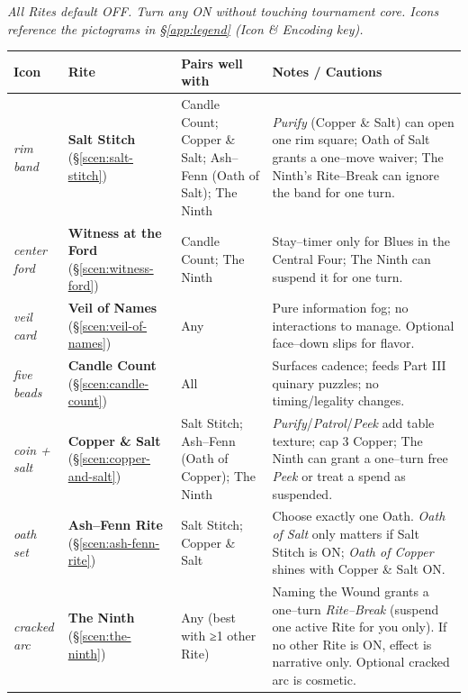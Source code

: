 \documentclass[11pt]{article}
\renewcommand{\arraystretch}{1.15}
\begin{document}
\begin{itemize}
\noindent\textit{All Rites default \textsc{OFF}. Turn any \textsc{ON} without touching tournament core. Icons reference the pictograms in \S\ref{app:legend} (Icon \& Encoding key).}

\medskip
\renewcommand{\arraystretch}{1.18}
\begin{tabular}{p{2.2cm} p{3.8cm} p{6.6cm} p{4.2cm}}
\toprule
\textbf{Icon} & \textbf{Rite} & \textbf{Pairs well with} & \textbf{Notes / Cautions}\\
\midrule
\textit{rim band} %
& \textbf{Salt Stitch} (\S\ref{scen:salt-stitch})
& Candle Count; Copper \& Salt; Ash–Fenn (Oath of Salt); The Ninth
& \emph{Purify} (Copper \& Salt) can open one rim square; Oath of Salt grants a one–move waiver; The Ninth’s Rite–Break can ignore the band for one turn.\\

\textit{center ford} %
& \textbf{Witness at the Ford} (\S\ref{scen:witness-ford})
& Candle Count; The Ninth
& Stay–timer only for Blues in the Central Four; The Ninth can suspend it for one turn.\\

\textit{veil card} %
& \textbf{Veil of Names} (\S\ref{scen:veil-of-names})
& Any
& Pure information fog; no interactions to manage. Optional face–down slips for flavor.\\

\textit{five beads} %
& \textbf{Candle Count} (\S\ref{scen:candle-count})
& All
& Surfaces cadence; feeds Part III quinary puzzles; no timing/legality changes.\\

\textit{coin + salt} %
& \textbf{Copper \& Salt} (\S\ref{scen:copper-and-salt})
& Salt Stitch; Ash–Fenn (Oath of Copper); The Ninth
& \emph{Purify}/\emph{Patrol}/\emph{Peek} add table texture; cap 3 Copper; The Ninth can grant a one–turn free \emph{Peek} or treat a spend as suspended.\\

\textit{oath set} %
& \textbf{Ash–Fenn Rite} (\S\ref{scen:ash-fenn-rite})
& Salt Stitch; Copper \& Salt
& Choose exactly one Oath. \emph{Oath of Salt} only matters if Salt Stitch is \textsc{ON}; \emph{Oath of Copper} shines with Copper \& Salt \textsc{ON}.\\

\textit{cracked arc} %
& \textbf{The Ninth} (\S\ref{scen:the-ninth})
& Any (best with ≥1 other Rite)
& Naming the Wound grants a one–turn \emph{Rite–Break} (suspend one active Rite for you only). If no other Rite is \textsc{ON}, effect is narrative only. Optional cracked arc is cosmetic.\\
\bottomrule
\end{tabular}


\end{itemize}
\end{document}
